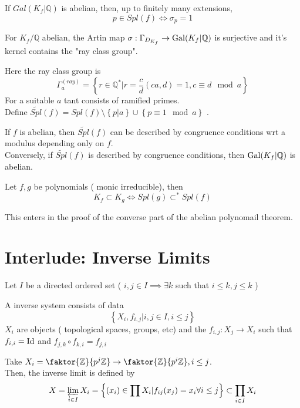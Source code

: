 \documentclass[../main.tex]{subfiles}
\begin{document}
\begin{lemma}
	If $Gal( K_f| \mathbb{Q}) $ is abelian, then, up to finitely many extensions,
	\[ 
	p \in Spl( f) \iff \sigma_p=1
	\]
	
\end{lemma}
\begin{thm}
	For $K_f / \mathbb{Q}$ abelian, the Artin map $\sigma: \Gamma_{D_{K_f} } \to \operatorname{Gal}( K_f| \mathbb{Q}) $ is surjective and it's kernel contains the "ray class group".
\end{thm}
Here the ray class group is 
\[ 
\Gamma_a ^{( ray) }= \left\{ r\in \mathbb{Q}^{*}| r= \frac{c}{d} ( ca,d) =1, c\equiv d \mod a \right\} 
\]
For a suitable $a$ tant consists of ramified primes.\\
Define $\tilde{Spl}( f)= Spl( f) \setminus \left\{ p|a \right\}  \cup \left\{ p\equiv 1 \mod a \right\}  $ .
\begin{thm}
	If $f$ is abelian, then $\tilde { Spl} ( f) $ can be described by congruence conditions wrt a modulus depending only on $f$.\\
	Conversely, if $ \tilde{Spl} ( f) $ is described by congruence conditions, then $\operatorname{Gal}( K_f| \mathbb{Q}) $ is abelian.
\end{thm}
\begin{thm}
	Let $f,g$ be polynomials ( monic irreducible), then
	\[ 
	K_f \subset K_g \iff Spl( g) \subset ^{\ast}Spl( f) 
	\]
\end{thm}
This enters in the proof of the converse part of the abelian polynomail theorem.
\section{Interlude: Inverse Limits}
Let $I$ be a directed ordered set  ( $i,j\in I\implies \exists k $ such that $i \leq k, j \leq k$  ) 
\begin{defn}
	A inverse system consists of data
	\[ 
	\left\{ X_i, f_{i,j} | i,j \in I, i \leq j \right\} 
	\]
	$X_i$ are objects ( topological spaces, groups, etc) and the $f_{i,j} :X_j \to X_i$ such that $f_{i,i} = \operatorname{Id}$ and $f_{j,k} \circ f_{k,i} = f_{j,i}  $ 
\end{defn}
\begin{exemple}
Take $X_i = \faktor{\mathbb{Z}}{p^{j}\mathbb{Z}}\to \faktor{\mathbb{Z}}{p^{i} \mathbb{Z}}, i \leq j $.\\
Then, the inverse limit is defined by 
\[ 
X= \varprojlim_{i \in I} X_i = \left\{ ( x_i) \in \prod X_i | f_{ij} ( x_j) = x_i \forall i \leq  j \right\}  \subset \prod_{i \in I} X_i
\]

\end{exemple}
\end{document}
